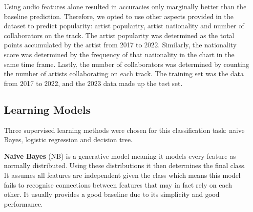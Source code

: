 \documentclass{article}
\begin{document}
Using audio features alone resulted in accuracies only marginally better than the baseline prediction.
Therefore, we opted to use other aspects provided in the dataset to predict popularity: artist popularity, artist nationality and number of collaborators on the track. The artist popularity was determined as the total points accumulated by the artist from 2017 to 2022. Similarly, the nationality score was determined by the frequency of that nationality in the chart in the same time frame. Lastly, the number of collaborators was determined by counting the number of artists collaborating on each track. The training set was the data from 2017 to 2022, and the 2023 data made up the test set.

\subsection{Learning Models}
Three supervised learning methods were chosen for this classification task: naive Bayes, logistic regression and decision tree. 

\textbf{Naive Bayes} (NB) is a generative model meaning it models every feature as normally distributed. Using these distributions it then 
determines the final class.
It assumes all features are independent given the class which means this model fails to recognise connections between features that may in fact rely on each other. It usually provides a good baseline due to its simplicity and good performance.


\end{document}
